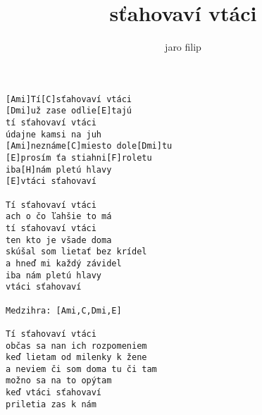 \author{jaro filip}
\title{sťahovaví vtáci}
\maketitle
\begin{verbatim}
[Ami]Tí[C]sťahovaví vtáci 
[Dmi]už zase odlie[E]tajú 
tí sťahovaví vtáci 
údajne kamsi na juh 
[Ami]neznáme[C]miesto dole[Dmi]tu 
[E]prosím ťa stiahni[F]roletu 
iba[H]nám pletú hlavy 
[E]vtáci sťahovaví 

Tí sťahovaví vtáci 
ach o čo ľahšie to má 
tí sťahovaví vtáci 
ten kto je všade doma 
skúšal som lietať bez krídel 
a hneď mi každý závidel 
iba nám pletú hlavy 
vtáci sťahovaví 

Medzihra: [Ami,C,Dmi,E]

Tí sťahovaví vtáci 
občas sa nan ich rozpomeniem 
keď lietam od milenky k žene 
a neviem či som doma tu či tam 
možno sa na to opýtam 
keď vtáci sťahovaví 
priletia zas k nám
\end{verbatim}